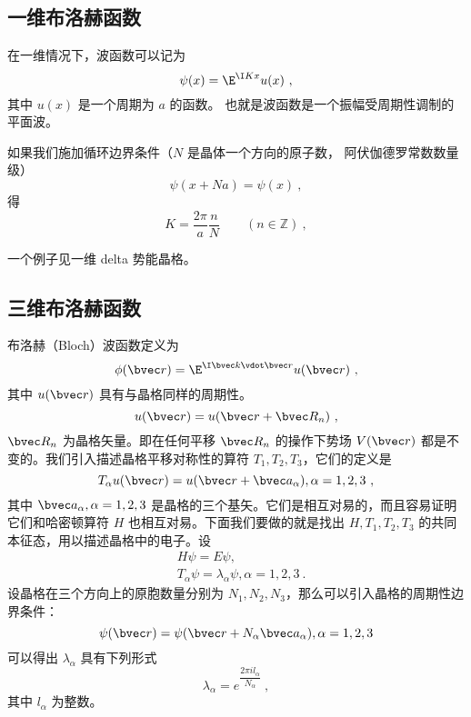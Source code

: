 \subsection{一维布洛赫函数}
在一维情况下，波函数可以记为
\begin{equation}
\psi(x) = \E^{\I K x} u(x)~,
\end{equation}
其中 $u(x)$ 是一个周期为 $a$ 的函数。 也就是波函数是一个振幅受周期性调制的平面波。

如果我们施加循环边界条件（$N$ 是晶体一个方向的原子数， 阿伏伽德罗常数数量级）
\begin{equation}
\psi(x+Na) = \psi(x)~,
\end{equation}
得
\begin{equation}
K = \frac{2\pi}{a} \frac{n}{N} \qquad (n \in \mathbb Z)~,
\end{equation}

一个例子见一维 delta 势能晶格。

\subsection{三维布洛赫函数}

\cite{黄昆}\cite{Bransden}布洛赫（Bloch）波函数定义为
\begin{equation}\label{eq_Bloch_3}
\phi(\bvec r) = \E^{\I \bvec k \vdot \bvec r} u(\bvec r)~,
\end{equation}
其中 $u(\bvec r)$ 具有与晶格同样的周期性。
\begin{equation}
u(\bvec r)=u(\bvec r+\bvec R_n)~,
\end{equation}
$\bvec R_n$ 为晶格矢量。即在任何平移 $\bvec R_n$ 的操作下势场 $V(\bvec r)$ 都是不变的。我们引入描述晶格平移对称性的算符 $T_1,T_2,T_3$，它们的定义是
\begin{equation}
T_\alpha u(\bvec r)= u(\bvec r+\bvec a_\alpha),\alpha=1,2,3~,
\end{equation}
其中 $\bvec a_\alpha,\alpha=1,2,3$ 是晶格的三个基矢。它们是相互对易的，而且容易证明它们和哈密顿算符 $H$ 也相互对易。下面我们要做的就是找出 $H,T_1,T_2,T_3$ 的共同本征态，用以描述晶格中的电子。设
\begin{equation}
\begin{aligned}
&H\psi=E\psi,\\
&T_\alpha \psi = \lambda_\alpha \psi, \alpha=1,2,3~.
\end{aligned}
\end{equation}
设晶格在三个方向上的原胞数量分别为 $N_1,N_2,N_3$，那么可以引入晶格的周期性边界条件：
\begin{equation}
\psi(\bvec r)=\psi(\bvec r+N_\alpha \bvec a_\alpha),\alpha=1,2,3
\end{equation}
可以得出 $\lambda_\alpha$ 具有下列形式
\begin{equation}
\lambda_\alpha=e^{ \dfrac{2\pi i l_\alpha}{N_\alpha}}~,
\end{equation}
其中 $l_\alpha$ 为整数。

